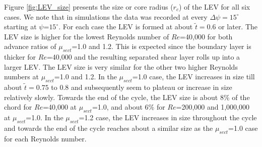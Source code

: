 Figure \ref{fig:LEV_size} presents the size or core radius ($r_c$) of the LEV for all six cases.
We note that in simulations the data was recorded at every $\Delta \psi = 15^\circ$ starting at $\psi$=$15^\circ$.
For each case the LEV is formed at about $\tilde{t}=0.6$ or later.
The LEV size is higher for the lowest Reynolds number of $Re$=40,000 for both advance ratios of $\mu_{sect}$=1.0 and 1.2.
This is expected since the boundary layer is thicker for $Re$=40,000 and the resulting separated shear layer rolls up into a larger LEV.
The LEV size is very similar for the other two higher Reynolds numbers at $\mu_{sect}$=1.0 and 1.2.
In the $\mu_{sect}$=1.0 case, the LEV increases in size till about $\tilde{t}=0.75$ to 0.8 and subsequently seem to plateau or increase in size relatively slowly.
Towards the end of the cycle, the LEV size is about 8\% of the chord for $Re$=40,000 at $\mu_{sect}$=1.0, and about 6\% for $Re$=200,000 and 1,000,000 at $\mu_{sect}$=1.0.
In the $\mu_{sect}$=1.2 case, the LEV increases in size throughout the cycle and towards the end of the cycle reaches about a similar size as the $\mu_{sect}$=1.0 case for each Reynolds number.

